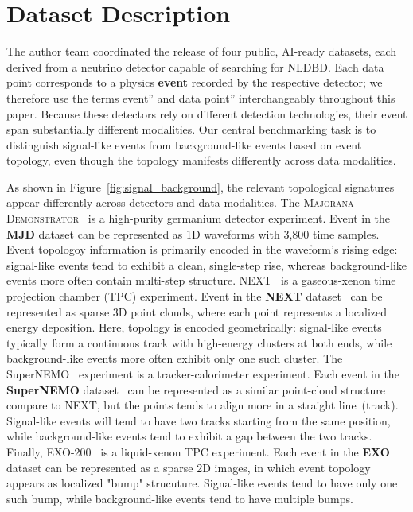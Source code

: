 
\section{Dataset Description}
\label{sec:datasets}


 
The author team coordinated the release of four public, AI-ready datasets, each derived from a neutrino detector capable of searching for NLDBD. Each data point corresponds to a physics \textbf{event} recorded by the respective detector; we therefore use the terms event'' and data point'' interchangeably throughout this paper. Because these detectors rely on different detection technologies, their event span substantially different modalities. Our central benchmarking task is to distinguish signal-like events from background-like events based on event topology, even though the topology manifests differently across data modalities. 

As shown in Figure~\ref{fig:signal_background}, the relevant topological signatures appear differently across detectors and data modalities. The \textsc{Majorana Demonstrator}~\cite{Arnquist23} is a high-purity germanium detector experiment. Event in the \textbf{MJD} dataset can be represented as 1D waveforms with 3,800 time samples. Event topologoy information is primarily encoded in the waveform's rising edge: signal-like events tend to exhibit a clean, single-step rise, whereas background-like events more often contain multi-step structure. NEXT~\cite{Novella23} is a gaseous-xenon time projection chamber (TPC) experiment. Event in the \textbf{NEXT} dataset~\cite{next_ml_dataset} can be represented as sparse 3D point clouds, where each point represents a localized energy deposition. Here, topology is encoded geometrically: signal-like events typically form a continuous track with high-energy clusters at both ends, while background-like events more often exhibit only one such cluster. The SuperNEMO~\cite{Petro25} experiment is a tracker-calorimeter experiment. Each event in the \textbf{SuperNEMO} dataset~\cite{supernemo_ml_dataset} can be represented as a similar point-cloud structure compare to NEXT, but the points tends to align more in a straight line~(track). Signal-like events will tend to have two tracks starting from the same position, while background-like events tend to exhibit a gap between the two tracks. Finally, EXO-200~\cite{Anton19} is a liquid-xenon TPC experiment. Each event in the \textbf{EXO} dataset can be represented as a sparse 2D images, in which event topology appears as localized "bump" strucuture. Signal-like events tend to have only one such bump, while background-like events tend to have multiple bumps.

